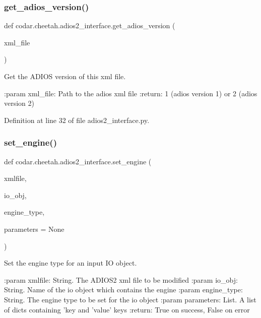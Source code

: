 \subsubsection{\texorpdfstring{get\+\_\+adios\+\_\+version()}{get\_adios\_version()}}
{\footnotesize\ttfamily def codar.\+cheetah.\+adios2\+\_\+interface.\+get\+\_\+adios\+\_\+version (\begin{DoxyParamCaption}\item[{}]{xml\+\_\+file }\end{DoxyParamCaption})}

\begin{DoxyVerb}Get the ADIOS version of this xml file.

:param xml_file: Path to the adios xml file
:return: 1 (adios version 1) or 2 (adios version 2)
\end{DoxyVerb}
 

Definition at line 32 of file adios2\+\_\+interface.\+py.

\mbox{\label{namespacecodar_1_1cheetah_1_1adios2__interface_ac7a185c06b845d8a964ef05d380d9406}} 
\subsubsection{\texorpdfstring{set\+\_\+engine()}{set\_engine()}}
{\footnotesize\ttfamily def codar.\+cheetah.\+adios2\+\_\+interface.\+set\+\_\+engine (\begin{DoxyParamCaption}\item[{}]{xmlfile,  }\item[{}]{io\+\_\+obj,  }\item[{}]{engine\+\_\+type,  }\item[{}]{parameters = {\ttfamily None} }\end{DoxyParamCaption})}

\begin{DoxyVerb}Set the engine type for an input IO object.

:param xmlfile: String. The ADIOS2 xml file to be modified
:param io_obj: String. Name of the io object which contains the engine
:param engine_type: String. The engine type to be set for the io object
:param parameters: List. A list of dicts containing 'key and 'value' keys
:return: True on success, False on error
\end{DoxyVerb}
 

